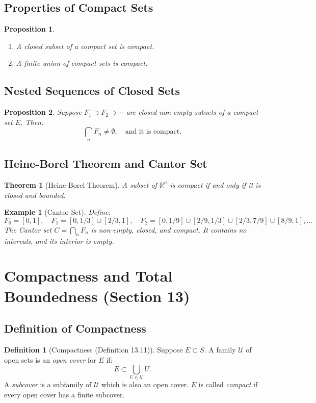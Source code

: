 \documentclass[9pt]{article}
\theoremstyle{definition}
\newtheorem{definition}{Definition}
\theoremstyle{plain}
\newtheorem{theorem}{Theorem}
\newtheorem{proposition}{Proposition}
\newtheorem{example}{Example}
\begin{document}
\subsection*{Properties of Compact Sets}
\begin{proposition}
\leavevmode
\begin{enumerate}
    \item A closed subset of a compact set is compact.
    \item A finite union of compact sets is compact.
\end{enumerate}
\end{proposition}

\subsection*{Nested Sequences of Closed Sets}
\begin{proposition}
Suppose \( F_1 \supset F_2 \supset \cdots \) are closed non-empty subsets of a compact set \( E \). Then:
\[
\bigcap_{n} F_n \neq \emptyset, \quad \text{and it is compact.}
\]
\end{proposition}

\subsection*{Heine-Borel Theorem and Cantor Set}
\begin{theorem}[Heine-Borel Theorem]
A subset of \( \mathbb{R}^n \) is compact if and only if it is closed and bounded.
\end{theorem}

\begin{example}[Cantor Set]
Define:
\[
F_0 = [0, 1], \quad F_1 = [0, 1/3] \cup [2/3, 1], \quad F_2 = [0, 1/9] \cup [2/9, 1/3] \cup [2/3, 7/9] \cup [8/9, 1], \dots
\]
The Cantor set \( C = \bigcap_n F_n \) is non-empty, closed, and compact. It contains no intervals, and its interior is empty.
\end{example}
\section*{Compactness and Total Boundedness (Section 13)}

\subsection*{Definition of Compactness}
\begin{definition}[Compactness (Definition 13.11)]
Suppose \( E \subset S \). A family \( \mathcal{U} \) of open sets is an \textit{open cover} for \( E \) if:
\[
E \subset \bigcup_{U \in \mathcal{U}} U.
\]
A \textit{subcover} is a subfamily of \( \mathcal{U} \) which is also an open cover. \( E \) is called \textit{compact} if every open cover has a finite subcover.
\end{definition}
\end{document}
